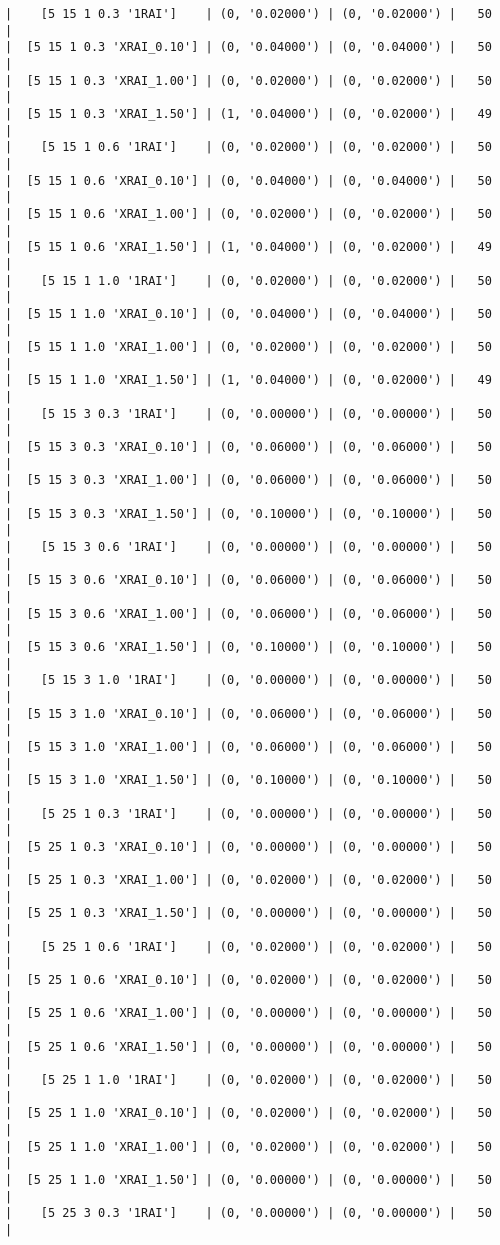 \documentclass{article}
\begin{document}
\begin{verbatim}
|    [5 15 1 0.3 '1RAI']    | (0, '0.02000') | (0, '0.02000') |   50  |
|  [5 15 1 0.3 'XRAI_0.10'] | (0, '0.04000') | (0, '0.04000') |   50  |
|  [5 15 1 0.3 'XRAI_1.00'] | (0, '0.02000') | (0, '0.02000') |   50  |
|  [5 15 1 0.3 'XRAI_1.50'] | (1, '0.04000') | (0, '0.02000') |   49  |
|    [5 15 1 0.6 '1RAI']    | (0, '0.02000') | (0, '0.02000') |   50  |
|  [5 15 1 0.6 'XRAI_0.10'] | (0, '0.04000') | (0, '0.04000') |   50  |
|  [5 15 1 0.6 'XRAI_1.00'] | (0, '0.02000') | (0, '0.02000') |   50  |
|  [5 15 1 0.6 'XRAI_1.50'] | (1, '0.04000') | (0, '0.02000') |   49  |
|    [5 15 1 1.0 '1RAI']    | (0, '0.02000') | (0, '0.02000') |   50  |
|  [5 15 1 1.0 'XRAI_0.10'] | (0, '0.04000') | (0, '0.04000') |   50  |
|  [5 15 1 1.0 'XRAI_1.00'] | (0, '0.02000') | (0, '0.02000') |   50  |
|  [5 15 1 1.0 'XRAI_1.50'] | (1, '0.04000') | (0, '0.02000') |   49  |
|    [5 15 3 0.3 '1RAI']    | (0, '0.00000') | (0, '0.00000') |   50  |
|  [5 15 3 0.3 'XRAI_0.10'] | (0, '0.06000') | (0, '0.06000') |   50  |
|  [5 15 3 0.3 'XRAI_1.00'] | (0, '0.06000') | (0, '0.06000') |   50  |
|  [5 15 3 0.3 'XRAI_1.50'] | (0, '0.10000') | (0, '0.10000') |   50  |
|    [5 15 3 0.6 '1RAI']    | (0, '0.00000') | (0, '0.00000') |   50  |
|  [5 15 3 0.6 'XRAI_0.10'] | (0, '0.06000') | (0, '0.06000') |   50  |
|  [5 15 3 0.6 'XRAI_1.00'] | (0, '0.06000') | (0, '0.06000') |   50  |
|  [5 15 3 0.6 'XRAI_1.50'] | (0, '0.10000') | (0, '0.10000') |   50  |
|    [5 15 3 1.0 '1RAI']    | (0, '0.00000') | (0, '0.00000') |   50  |
|  [5 15 3 1.0 'XRAI_0.10'] | (0, '0.06000') | (0, '0.06000') |   50  |
|  [5 15 3 1.0 'XRAI_1.00'] | (0, '0.06000') | (0, '0.06000') |   50  |
|  [5 15 3 1.0 'XRAI_1.50'] | (0, '0.10000') | (0, '0.10000') |   50  |
|    [5 25 1 0.3 '1RAI']    | (0, '0.00000') | (0, '0.00000') |   50  |
|  [5 25 1 0.3 'XRAI_0.10'] | (0, '0.00000') | (0, '0.00000') |   50  |
|  [5 25 1 0.3 'XRAI_1.00'] | (0, '0.02000') | (0, '0.02000') |   50  |
|  [5 25 1 0.3 'XRAI_1.50'] | (0, '0.00000') | (0, '0.00000') |   50  |
|    [5 25 1 0.6 '1RAI']    | (0, '0.02000') | (0, '0.02000') |   50  |
|  [5 25 1 0.6 'XRAI_0.10'] | (0, '0.02000') | (0, '0.02000') |   50  |
|  [5 25 1 0.6 'XRAI_1.00'] | (0, '0.00000') | (0, '0.00000') |   50  |
|  [5 25 1 0.6 'XRAI_1.50'] | (0, '0.00000') | (0, '0.00000') |   50  |
|    [5 25 1 1.0 '1RAI']    | (0, '0.02000') | (0, '0.02000') |   50  |
|  [5 25 1 1.0 'XRAI_0.10'] | (0, '0.02000') | (0, '0.02000') |   50  |
|  [5 25 1 1.0 'XRAI_1.00'] | (0, '0.02000') | (0, '0.02000') |   50  |
|  [5 25 1 1.0 'XRAI_1.50'] | (0, '0.00000') | (0, '0.00000') |   50  |
|    [5 25 3 0.3 '1RAI']    | (0, '0.00000') | (0, '0.00000') |   50  |

\end{verbatim}
\end{document}
